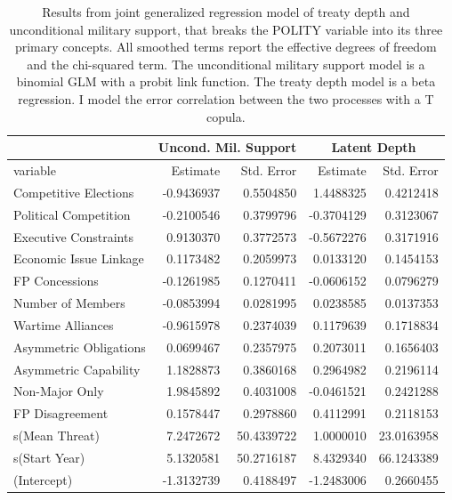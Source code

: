 \documentclass[12pt]{article}
\begin{document}
\begin{table}[ht]
\centering
\begin{tabular}{lrrrr}
  & \multicolumn{2}{c}{Uncond. Mil. Support} & \multicolumn{2}{c}{Latent Depth}\\ \hline
variable & Estimate & Std. Error & Estimate & Std. Error \\ 
  \hline
  Competitive Elections & -0.9436937 & 0.5504850 & 1.4488325 & 0.4212418 \\ 
  Political Competition & -0.2100546 & 0.3799796 & -0.3704129 & 0.3123067 \\ 
  Executive Constraints & 0.9130370 & 0.3772573 & -0.5672276 & 0.3171916 \\ 
  Economic Issue Linkage & 0.1173482 & 0.2059973 & 0.0133120 & 0.1454153 \\ 
  FP Concessions & -0.1261985 & 0.1270411 & -0.0606152 & 0.0796279 \\ 
  Number of Members & -0.0853994 & 0.0281995 & 0.0238585 & 0.0137353 \\ 
  Wartime Alliances & -0.9615978 & 0.2374039 & 0.1179639 & 0.1718834 \\ 
  Asymmetric Obligations & 0.0699467 & 0.2357975 & 0.2073011 & 0.1656403 \\ 
  Asymmetric Capability & 1.1828873 & 0.3860168 & 0.2964982 & 0.2196114 \\ 
  Non-Major Only & 1.9845892 & 0.4031008 & -0.0461521 & 0.2421288 \\ 
  FP Disagreement & 0.1578447 & 0.2978860 & 0.4112991 & 0.2118153 \\ 
  s(Mean Threat) & 7.2472672 & 50.4339722 & 1.0000010 & 23.0163958 \\ 
  s(Start Year) & 5.1320581 & 50.2716187 & 8.4329340 & 66.1243389 \\
  (Intercept) & -1.3132739 & 0.4188497 & -1.2483006 & 0.2660455 \\  
   \hline
\end{tabular}
\caption{Results from joint generalized regression model of treaty depth and unconditional military support, that breaks the POLITY variable into its three primary concepts.  
                     All smoothed terms report the effective degrees of freedom and the chi-squared term. 
                     The unconditional military support model is a binomial GLM with a probit link function. 
                     The treaty depth model is a beta regression. 
                    I model the error correlation between the two processes with  a T copula.} 
\label{tab:gjrm-res-split}
\end{table}
\end{document}
